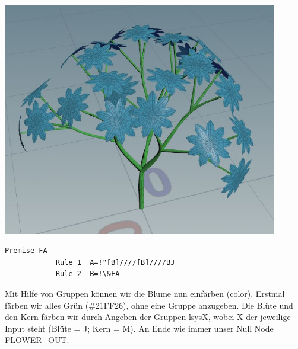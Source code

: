 \documentclass[paper=a4,fontsize=12pt,ngerman]{scrartcl}
\begin{document}
		\begin{minipage}{0.3\textwidth}
		\includegraphics[width=0.9\textwidth]{graphics/flowerfour1.JPG}
	\end{minipage}
	\begin{minipage}{0.7\textwidth}
		\begin{lstlisting}[caption={Flower Four},basicstyle=\scriptsize]
			Premise FA
			Rule 1	A=!"[B]////[B]////BJ
			Rule 2	B=!\&FA
		\end{lstlisting} 
	\end{minipage}
	Mit Hilfe von Gruppen können wir die Blume nun einfärben (color). Erstmal färben wir alles Grün (\#21FF26), ohne eine Gruppe anzugeben. Die Blüte und den Kern färben wir durch Angeben der Gruppen lsysX, wobei X der jeweilige Input steht (Blüte = J; Kern = M). An Ende wie immer unser Null Node FLOWER\_OUT.
	
\end{document}
